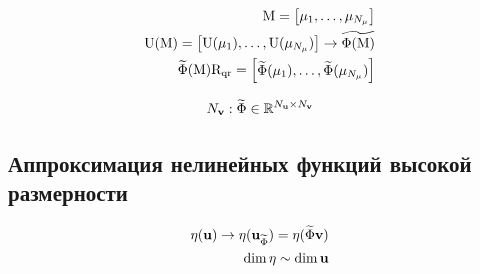 \begin{align}
    \matr{M} =\begin{bmatrix}
        \param_1, \dots, \param_{N_\param}
    \end{bmatrix}\\
    \matr{U}(\matr{M}) =
    \begin{bmatrix}
        \matr{U}(\param_1), \dots, \matr{U}(\param_{N_\param})
    \end{bmatrix}
    \rightarrow \widetilde{\Phi (\matr{M})} \\
    \widetilde{\Phi} (\matr{M}) \matr{R}_\text{qr} =
    \begin{bmatrix}
        \widetilde{\Phi}(\param_1), \dots,  \widetilde{\Phi}(\param_{N_\param})
    \end{bmatrix}
\end{align}

\begin{equation}
N_{\mathbf{v}} : \widetilde{\Phi} \in \mathbb{R}^{N_{\mathbf{u}} \times N_{\mathbf{v}}}
\end{equation}

\begin{figure}[ht]
    \caption{ \cite{Elizarev2022}}\label{fig:ROM-I}
\end{figure}

\subsection{Аппроксимация нелинейных функций высокой размерности}

\begin{align}
 \mathbf{\eta}(\mathbf{u}) \rightarrow \mathbf{\eta} (\mathbf{u}_{\widetilde{\Phi}}) = \mathbf{\eta} (\widetilde{\Phi} \mathbf{v}) \\
 \dim{\mathbf{\eta}} \sim \dim{\mathbf{u}}
\end{align}

